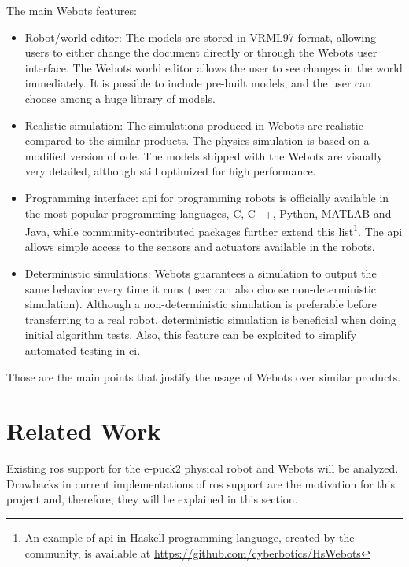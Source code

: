 The main Webots features:
\begin{itemize}
    \item Robot/world editor: The models are stored in VRML97 format, allowing users to either change the document directly or through the Webots user interface. The Webots world editor allows the user to see changes in the world immediately. It is possible to include pre-built models, and the user can choose among a huge library of models.
    \item Realistic simulation: The simulations produced in Webots are realistic compared to the similar products. The physics simulation is based on a modified version of \ac{ode}. The models shipped with the Webots are visually very detailed, although still optimized for high performance.
    \item Programming interface: \ac{api} for programming robots is officially available in the most popular programming languages, C, C++, Python, MATLAB and Java, while community-contributed packages further extend this list\footnote{An example of \ac{api} in Haskell programming language, created by the community, is available at \url{https://github.com/cyberbotics/HsWebots}}. The \ac{api} allows simple access to the sensors and actuators available in the robots.
    \item Deterministic simulations: Webots guarantees a simulation to output the same behavior every time it runs (user can also choose non-deterministic simulation). Although a non-deterministic simulation is preferable before transferring to a real robot, deterministic simulation is beneficial when doing initial algorithm tests. Also, this feature can be exploited to simplify automated testing in \ac{ci}.
\end{itemize}

Those are the main points that justify the usage of Webots over similar products.

\section{Related Work}
Existing \ac{ros} support for the e-puck2 physical robot and Webots will be analyzed. Drawbacks in current implementations of \ac{ros} support are the motivation for this project and, therefore, they will be explained in this section.

